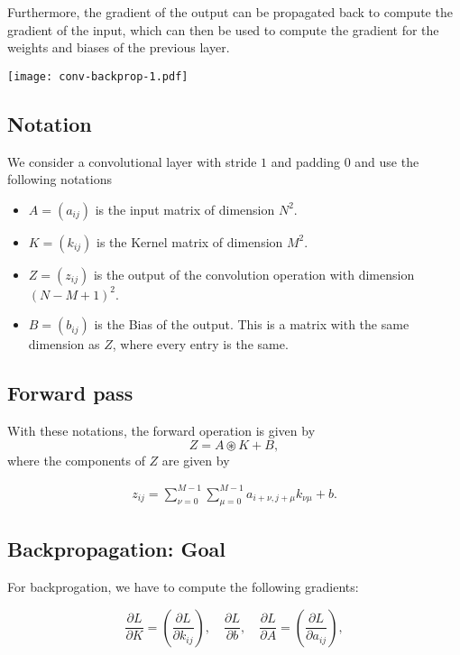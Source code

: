 \documentclass[a4paper,10pt]{article}
\begin{document}
Furthermore, the gradient of the output can be propagated back to 
compute the gradient of the input, which can then be used to compute the 
gradient for the weights and biases of the previous layer.

\begin{center}
\texttt{[image: conv-backprop-1.pdf]}
\end{center}

\subsection*{Notation}

We consider a convolutional layer with stride $1$ and padding $0$ and use the following 
notations 
\begin{itemize}
    \item $A= (a_{ij})$ is the input matrix of dimension $N^2$.
    \item $K= (k_{ij})$ is the Kernel matrix of dimension $M^2$.
    \item $Z= (z_{ij})$ is the output of the convolution operation with dimension ${(N-M+1)}^2$.
    \item $B= (b_{ij})$ is the Bias of the output. This is a matrix with the same dimension as $Z$, where every entry is the same.  
\end{itemize}

\subsection*{Forward pass}

With these notations, the forward operation is given by
\[
    Z = A \circledast K + B,
\]
where the components of $Z$ are given by

\begin{align}
    \label{eq:conv-1}
    z_{ij} = \sum_{\nu=0}^{M-1} \sum_{\mu=0}^{M-1} a_{i+\nu, j+\mu} k_{\nu \mu} + b.
\end{align}

\subsection*{Backpropagation: Goal}

For backprogation, we have to compute the following gradients:

\begin{equation}
    \frac{\partial L}{\partial K} = \left( \frac{\partial L}{\partial k_{ij}} \right), 
    \quad
    \frac{\partial L}{\partial b},
    \quad 
    \frac{\partial L}{\partial A} = \left( \frac{\partial L}{\partial a_{ij}} \right),
\end{equation}
\end{document}
